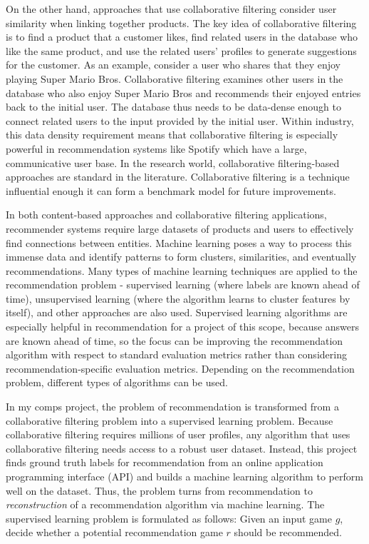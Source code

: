 \documentclass[10pt,twocolumn]{article}
\begin{document}
On the other hand, approaches that use collaborative filtering consider user similarity when linking together products. The key idea of collaborative filtering is to find a product that a customer likes, find related users in the database who like the same product, and use the related users' profiles to generate suggestions for the customer. As an example, consider a user who shares that they enjoy playing Super Mario Bros. Collaborative filtering examines other users in the database who also enjoy Super Mario Bros and recommends their enjoyed entries back to the initial user. The database thus needs to be data-dense enough to connect related users to the input provided by the initial user. Within industry, this data density requirement means that collaborative filtering is especially powerful in recommendation systems like Spotify \cite{JacobsonSpotify} which have a large, communicative user base. In the research world, collaborative filtering-based approaches are standard in the literature. \cite{Chow, Ferdaous, PerezMarcos} Collaborative filtering is a technique influential enough it can form a benchmark model for future improvements. \cite{Gohari, Ramzan} 

In both content-based approaches and collaborative filtering applications, recommender systems require large datasets of products and users to effectively find connections between entities. Machine learning poses a way to process this immense data and identify patterns to form clusters, similarities, and eventually recommendations. Many types of machine learning techniques are applied to the recommendation problem - supervised learning (where labels are known ahead of time), unsupervised learning (where the algorithm learns to cluster features by itself), and other approaches are also used. \cite{Nawrocka, XuAraki} Supervised learning algorithms are especially helpful in recommendation for a project of this scope, because answers are known ahead of time, so the focus can be improving the recommendation algorithm with respect to standard evaluation metrics rather than considering recommendation-specific evaluation metrics. Depending on the recommendation problem, different types of algorithms can be used.

In my comps project, the problem of recommendation is transformed from a collaborative filtering problem into a supervised learning problem. Because collaborative filtering requires millions of user profiles, any algorithm that uses collaborative filtering needs access to a robust user dataset. Instead, this project finds ground truth labels for recommendation from an online application programming interface (API) and builds a machine learning algorithm to perform well on the dataset. Thus, the problem turns from recommendation to \textit{reconstruction} of a recommendation algorithm via machine learning. The supervised learning problem is formulated as follows: Given an input game $g$, decide whether a potential recommendation game $r$ should be recommended.
\end{document}
